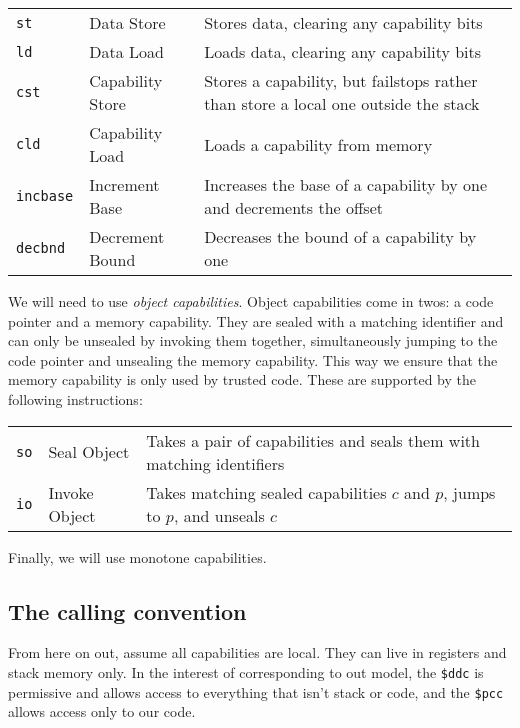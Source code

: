 \documentclass{article}
\begin{document}
\begin{tabular}{l l l}
  {\tt st}      & Data Store       & Stores data, clearing any capability bits \\
  {\tt ld}      & Data Load        & Loads data, clearing any capability bits \\
  {\tt cst}     & Capability Store & Stores a capability, but failstops rather than store
                                     a local one outside the stack \\
  {\tt cld}     & Capability Load  & Loads a capability from memory \\
  {\tt incbase} & Increment Base   & Increases the base of a capability by one and
                                     decrements the offset \\
  {\tt decbnd}  & Decrement Bound  & Decreases the bound of a capability by one \\
\end{tabular}

We will need to use {\em object capabilities}. Object capabilities come in twos:
a code pointer and a memory capability. They are sealed with a matching identifier and
can only be unsealed by invoking them together, simultaneously jumping to the code pointer
and unsealing the memory capability. This way we ensure that the memory capability is
only used by trusted code. These are supported by the following instructions:

\begin{tabular}{l l l}
  {\tt so} & Seal Object   & Takes a pair of capabilities and
                                  seals them with matching identifiers \\
  {\tt io} & Invoke Object & Takes matching sealed capabilities \(c\) and
                                  \(p\), jumps to \(p\), and unseals \(c\) \\
\end{tabular}

Finally, we will use monotone capabilities.

\subsection{The calling convention}

From here on out, assume all capabilities are local. They can live in registers and stack
memory only. In the interest of corresponding to out model, the {\tt \$ddc} is permissive
and allows access to everything that isn't stack or code, and the {\tt \$pcc} allows access
only to our code.
\end{document}
